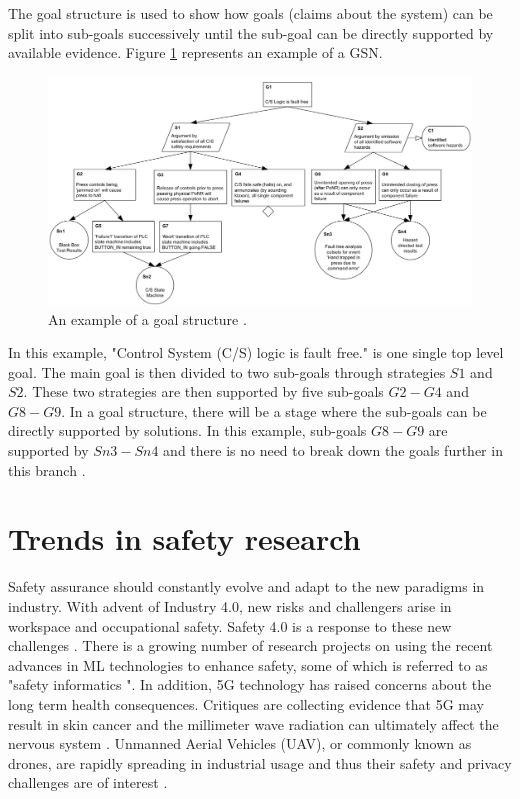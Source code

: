 The goal structure is used to show how goals (claims about the system) can be split into sub-goals successively until the sub-goal can be directly supported by available evidence. Figure \ref{fig:gsn-example} represents an example of a GSN.

\begin{figure}
    \includegraphics[width=0.9\linewidth ]{figures/gsn-example.png}
    \centering
    \caption{An example of a goal structure \cite{gsn2004Kelly}.}
    \label{fig:gsn-example}
\end{figure}

In this example, "Control System (C/S) logic is fault free." is one single top level goal. The main goal is then divided to two sub-goals through strategies $S1$ and $S2$. These two strategies are then supported by five sub-goals $G2-G4$ and $G8-G9$. In a goal structure, there will be a stage where the sub-goals can be directly supported by solutions. In this example, sub-goals $G8-G9$ are supported by $Sn3-Sn4$ and there is no need to break down the goals further in this branch \cite{gsn2004Kelly}.\\


\section{Trends in safety research}
Safety assurance should constantly evolve and adapt to the new paradigms in industry. With advent of Industry 4.0, new risks and challengers arise in workspace and occupational safety. Safety 4.0 is a response to these new challenges \cite{Laciok2021}. There is a growing number of research projects on using the recent advances in ML technologies to enhance safety, some of which is referred to as "safety informatics \cite{Wang2019}". In addition, 5G technology has raised concerns about the long term health consequences. Critiques are collecting evidence that 5G may result in skin cancer and the millimeter wave radiation can ultimately affect the nervous system \cite{Russel2018}. Unmanned Aerial Vehicles (UAV), or commonly known as drones, are rapidly spreading in industrial usage and thus their safety and privacy challenges are of interest \cite{Aydin2019}.